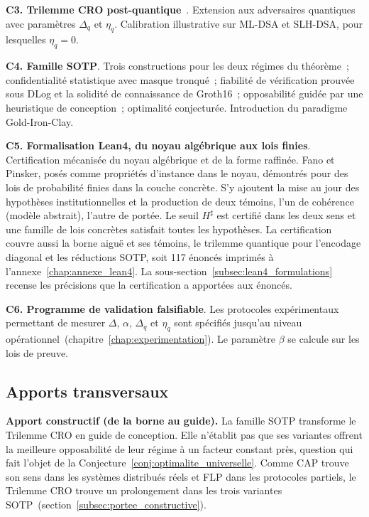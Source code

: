 \begin{sloppypar}
\textbf{C3. Trilemme CRO post-quantique}~\cite{MINKA2026PQCRO}. Extension
aux adversaires quantiques avec param\`etres $\Delta_q$ et $\eta_q$.
Calibration illustrative sur ML-DSA et SLH-DSA, pour lesquelles $\eta_q = 0$.

\textbf{C4. Famille SOTP}. Trois constructions pour les deux r\'egimes du th\'eor\`eme~;
confidentialit\'e statistique avec masque tronqu\'e~; fiabilit\'e de v\'erification prouv\'ee sous DLog et
la solidit\'e de connaissance de Groth16~; opposabilit\'e guid\'ee par une heuristique de conception~; optimalit\'e
conjectur\'ee. Introduction du paradigme Gold-Iron-Clay.

\textbf{C5. Formalisation Lean4, du noyau alg\'ebrique aux lois finies}. Certification m\'ecanis\'ee
du noyau alg\'ebrique et de la forme raffin\'ee. Fano et Pinsker, pos\'es comme
propri\'et\'es d'instance dans le noyau, d\'emontr\'es pour des lois de probabilit\'e finies
dans la couche concr\`ete. S'y ajoutent la mise au jour des hypoth\`eses institutionnelles
et la production de deux t\'emoins, l'un de coh\'erence (mod\`ele abstrait), l'autre de
port\'ee. Le seuil $H^\sharp$ est certifi\'e dans les deux sens et une famille de lois
concr\`etes satisfait toutes les hypoth\`eses. La certification couvre aussi la borne aigu\"e et ses t\'emoins,
le trilemme quantique pour l'encodage diagonal et les r\'eductions SOTP, soit 117 \'enonc\'es imprim\'es
\`a l'annexe~\ref{chap:annexe_lean4}. La sous-section~\ref{subsec:lean4_formulations} recense les
pr\'ecisions que la certification a apport\'ees aux \'enonc\'es.

\textbf{C6. Programme de validation falsifiable}. Les protocoles
exp\'erimentaux permettant de mesurer $\Delta$, $\alpha$, $\Delta_q$ et $\eta_q$ sont sp\'ecifi\'es
jusqu'au niveau op\'erationnel~(chapitre~\ref{chap:experimentation}). Le param\`etre $\beta$ se calcule
sur les lois de preuve.

\subsection*{Apports transversaux}

\textbf{Apport constructif (de la borne au guide).} La famille SOTP
transforme le Trilemme CRO en guide de conception. Elle n'\'etablit pas que ses variantes offrent
la meilleure opposabilit\'e de leur r\'egime \`a un facteur constant pr\`es, question qui fait l'objet de la
Conjecture~\ref{conj:optimalite_universelle}. Comme CAP trouve son sens dans
les syst\`emes distribu\'es r\'eels et FLP dans les protocoles partiels, le
Trilemme CRO trouve un prolongement dans les trois variantes
SOTP~(section~\ref{subsec:portee_constructive}).


\end{sloppypar}

